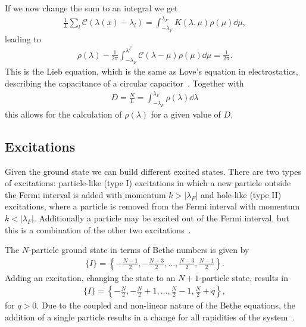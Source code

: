 \documentclass[11pt, a4paper]{report} %
\begin{document}
If we now change the sum to an integral we get 
\begin{align}
  \frac{1}{L} \sum_l \mathcal{C}(\lambda(x)- \lambda_l) = \int_{-\lambda_F}^{\lambda_F} K(\lambda,\mu) \rho(\mu) \dd \mu, 
\end{align}
leading to~\cite{Korepin1993}
\begin{align}
  \rho(\lambda) - \frac{1}{2\pi} \int_{-\lambda_F}^{\lambda^F} \mathcal{C}(\lambda-\mu) \rho(\mu) \dd \mu = \frac{1}{2\pi}.
\end{align}
This is the Lieb equation, which is the same as Love's equation in electrostatics, describing the capacitance of a circular capacitor~\cite{Gaudin2009}.
Together with 
\begin{align}
  D = \frac{N}{L} = \int_{-\lambda_F}^{\lambda_F} \rho(\lambda) \dd \lambda
\end{align}
this allows for the calculation of \(\rho(\lambda)\) for a given value of \(D\).


\subsection{Excitations}

Given the ground state we can build different excited states.
There are two types of excitations: particle-like (type I) excitations in which a new particle outside the Fermi interval is added with momentum \(k > \left|\lambda_F\right|\) and hole-like (type II) excitations, where a particle is removed from the Fermi interval with momentum \(k < \left|\lambda_F\right|\).
Additionally a particle may be excited out of the Fermi interval, but this is a combination of the other two excitations~\cite{Franchini2017}.

The \(N\)-particle ground state in terms of Bethe numbers is given by
\begin{align}
  \label{eq:22}
  \{I\} = \left\{-\frac{N-1}{2},-\frac{N-3}{2}, \ldots, \frac{N-3}{2},\frac{N-1}{2}\right\}.
\end{align}
Adding an excitation, changing the state to an \(N+1\)-particle state, results in
\begin{align}
  \label{eq:23}
    \{I\} = \left\{-\frac{N}{2},-\frac{N}{2}+1, \ldots, \frac{N}{2}-1,\frac{N}{2}+q\right\},
\end{align}
for \(q>0\).
Due to the coupled and non-linear nature of the Bethe equations, the addition of a single particle results in a change for all rapidities of the system~\cite{Franchini2017}.
\end{document}
